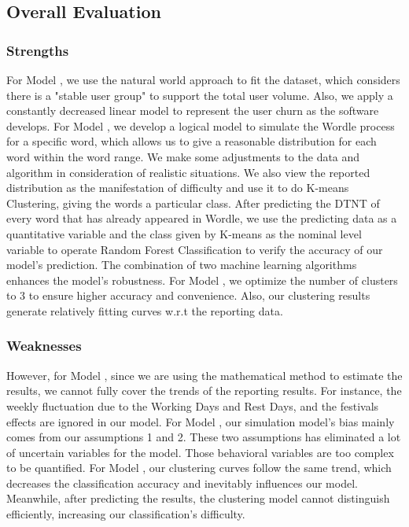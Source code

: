 \documentclass[12pt]{article}
\begin{document}
\subsection{Overall Evaluation}

\subsubsection{Strengths}

For Model \uppercase\expandafter{}, we use the natural world approach to fit the dataset, which considers there is a "stable user group" to support the total user volume. Also, we apply a constantly decreased linear model to represent the user churn as the software develops. For Model \uppercase\expandafter{}, we develop a logical model to simulate the Wordle process for a specific word, which allows us to give a reasonable distribution for each word within the word range. We make some adjustments to the data and algorithm in consideration of realistic situations. We also view the reported distribution as the manifestation of difficulty and use it to do K-means Clustering, giving the words a particular class. After predicting the DTNT of every word that has already appeared in Wordle, we use the predicting data as a quantitative variable and the class given by K-means as the nominal level variable to operate Random Forest Classification to verify the accuracy of our model's prediction. The combination of two machine learning algorithms enhances the model's robustness. For Model \uppercase\expandafter{}, we optimize the number of clusters to 3 to ensure higher accuracy and convenience. Also, our clustering results generate relatively fitting curves w.r.t the reporting data.

\subsubsection{Weaknesses}

However, for Model \uppercase\expandafter{}, since we are using the mathematical method to estimate the results, we cannot fully cover the trends of the reporting results. For instance, the weekly fluctuation due to the Working Days and Rest Days, and the festivals effects are ignored in our model. For Model \uppercase\expandafter{}, our simulation model's bias mainly comes from our assumptions 1 and 2. These two assumptions has eliminated a lot of uncertain variables for the model. Those behavioral variables are too complex to be quantified. For Model \uppercase\expandafter{}, our clustering curves follow the same trend, which decreases the classification accuracy and inevitably influences our model. Meanwhile, after predicting the results, the clustering model cannot distinguish efficiently, increasing our classification's difficulty.
\end{document}
